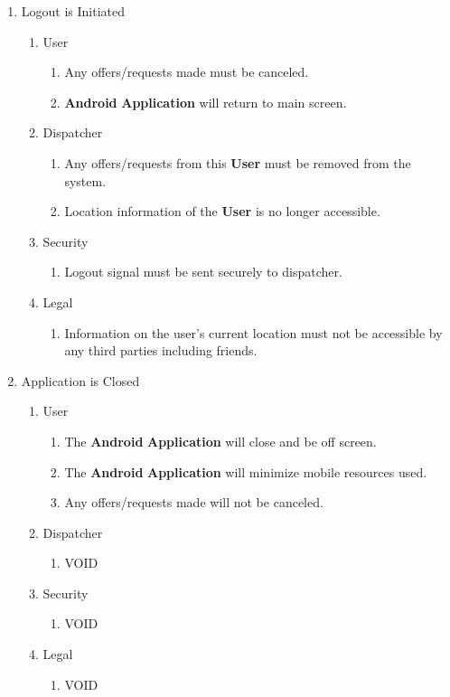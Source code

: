\documentclass[english]{article}
\begin{document}
\begin{enumerate}[{BE}1.]
	\item Logout is Initiated
	\begin{enumerate}[{VP13}.1]
		\item User
			\begin{enumerate}
				\item Any offers/requests made must be canceled.
				\item  \textbf{Android} \textbf{Application} will return to main screen.
			\end{enumerate}
		\item Dispatcher
			\begin{enumerate}
				\item Any offers/requests from this \textbf{User} must be removed from the system.
				\item Location information of the \textbf{User} is no longer accessible.
			\end{enumerate}
		\item Security
			\begin{enumerate}
				\item Logout signal must be sent securely to dispatcher.
			\end{enumerate}
		\item Legal
			\begin{enumerate}
				\item Information on the user's current location must not be accessible by any third parties including friends.
			\end{enumerate}
	\end{enumerate}

	\item Application is Closed
	\begin{enumerate}[{VP14}.1]
		\item User
			\begin{enumerate}
				\item The  \textbf{Android} \textbf{Application} will close and be off screen.
				\item The  \textbf{Android} \textbf{Application} will minimize mobile resources used.
				\item Any offers/requests made will not be canceled.
			\end{enumerate}
		\item Dispatcher
			\begin{enumerate}
				\item VOID
			\end{enumerate}
		\item Security
			\begin{enumerate}
				\item VOID
			\end{enumerate}
		\item Legal
			\begin{enumerate}
				\item VOID
			\end{enumerate}
	\end{enumerate}

\end{enumerate}
\end{document}
